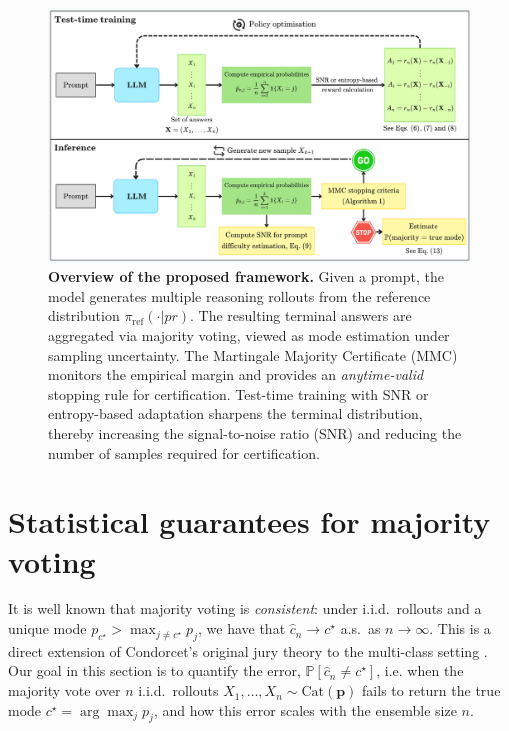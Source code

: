 \documentclass{article} %
\begin{document}
\begin{figure}[t]
    \centering
    \includegraphics[width=\linewidth]{figs/condorcet_framework.pdf}
    \caption{
    \textbf{Overview of the proposed framework.}
    Given a prompt, the model generates multiple reasoning rollouts from the
    reference distribution $\pi_{\mathrm{ref}}(\cdot|{pr})$.
    The resulting terminal answers are aggregated via majority voting, viewed
    as mode estimation under sampling uncertainty.
    The Martingale Majority Certificate (MMC) monitors the empirical margin and
    provides an \emph{anytime-valid} stopping rule for certification.
    Test-time training with SNR or entropy-based adaptation sharpens the
    terminal distribution, thereby increasing the
    signal-to-noise ratio (SNR) and reducing the number of samples required for
    certification. 
    }
    \label{fig:framework}
\end{figure}


\section{Statistical guarantees for majority voting}\label{sec:theoretical_bounds}

It is well known that majority voting is \emph{consistent}: under i.i.d.\ rollouts and a unique mode
$p_{c^\star}>\max_{j\neq c^\star}p_j$, we have that $\widehat{c}_n\to c^\star$ a.s.\ as $n\to\infty$.  This is a direct extension of Condorcet's original jury theory \citep{condorcet1785essai} to the multi-class setting \citep{list2001epistemic}.    Our goal in this section is to quantify the error, $\mathbb{P}[\widehat{c}_n \neq c^\star]$, i.e. when the majority vote over $n$ i.i.d.\ rollouts
$X_1,\dots,X_n \sim \mathrm{Cat}(\mathbf p)$ fails to return the true mode
$c^\star = \arg\max_j p_j$, and how this error scales with the ensemble size $n$.
\end{document}
